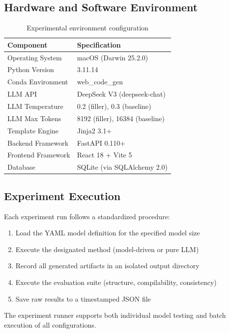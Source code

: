 \documentclass[11pt,a4paper]{article}
\begin{document}
\subsection{Hardware and Software Environment}

\begin{table}[H]
\centering
\caption{Experimental environment configuration}
\label{tab:env}
\begin{tabular}{ll}
\toprule
\textbf{Component} & \textbf{Specification} \\
\midrule
Operating System & macOS (Darwin 25.2.0) \\
Python Version   & 3.11.14 \\
Conda Environment & web\_code\_gen \\
LLM API          & DeepSeek V3 (deepseek-chat) \\
LLM Temperature  & 0.2 (filler), 0.3 (baseline) \\
LLM Max Tokens   & 8192 (filler), 16384 (baseline) \\
Template Engine  & Jinja2 3.1+ \\
Backend Framework & FastAPI 0.110+ \\
Frontend Framework & React 18 + Vite 5 \\
Database         & SQLite (via SQLAlchemy 2.0) \\
\bottomrule
\end{tabular}
\end{table}

\subsection{Experiment Execution}

Each experiment run follows a standardized procedure:

\begin{enumerate}[leftmargin=*]
    \item Load the YAML model definition for the specified model size
    \item Execute the designated method (model-driven or pure LLM)
    \item Record all generated artifacts in an isolated output directory
    \item Execute the evaluation suite (structure, compilability, consistency)
    \item Save raw results to a timestamped JSON file
\end{enumerate}

The experiment runner supports both individual model testing and batch execution of all configurations.
\end{document}
